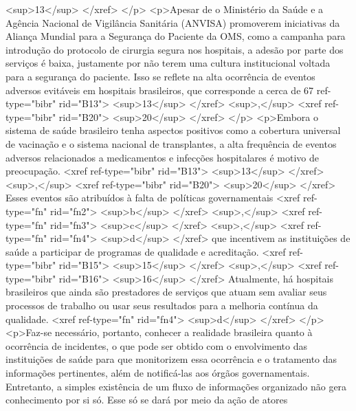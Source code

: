           <sup>13</sup>
        </xref>
      </p>
      <p>Apesar de o Ministério da Saúde e a Agência Nacional de Vigilância Sanitária (ANVISA)
        promoverem iniciativas da Aliança Mundial para a Segurança do Paciente da OMS, como a
        campanha para introdução do protocolo de cirurgia segura nos hospitais, a adesão por parte
        dos serviços é baixa, justamente por não terem uma cultura institucional voltada para a
        segurança do paciente. Isso se reflete na alta ocorrência de eventos adversos evitáveis em
        hospitais brasileiros, que corresponde a cerca de 67%
          ref-type="bibr" rid="B13">
          <sup>13</sup>
        </xref>
        <sup>,</sup>
        <xref ref-type="bibr" rid="B20">
          <sup>20</sup>
        </xref>
      </p>
      <p>Embora o sistema de saúde brasileiro tenha aspectos positivos como a cobertura universal de
        vacinação e o sistema nacional de transplantes, a alta frequência de eventos adversos
        relacionados a medicamentos e infecções hospitalares é motivo de preocupação. <xref
          ref-type="bibr" rid="B13">
          <sup>13</sup>
        </xref>
        <sup>,</sup>
        <xref ref-type="bibr" rid="B20">
          <sup>20</sup>
        </xref> Esses eventos são atribuídos à falta de políticas governamentais <xref ref-type="fn"
          rid="fn2">
          <sup>b</sup>
        </xref>
        <sup>,</sup>
        <xref ref-type="fn" rid="fn3">
          <sup>c</sup>
        </xref>
        <sup>,</sup>
        <xref ref-type="fn" rid="fn4">
          <sup>d</sup>
        </xref> que incentivem as instituições de saúde a participar de programas de qualidade e
        acreditação. <xref ref-type="bibr" rid="B15">
          <sup>15</sup>
        </xref>
        <sup>,</sup>
        <xref ref-type="bibr" rid="B16">
          <sup>16</sup>
        </xref> Atualmente, há hospitais brasileiros que ainda são prestadores de serviços que atuam
        sem avaliar seus processos de trabalho ou usar seus resultados para a melhoria contínua da
        qualidade. <xref ref-type="fn" rid="fn4">
          <sup>d</sup>
        </xref>
      </p>
      <p>Faz-se necessário, portanto, conhecer a realidade brasileira quanto à ocorrência de
        incidentes, o que pode ser obtido com o envolvimento das instituições de saúde para que
        monitorizem essa ocorrência e o tratamento das informações pertinentes, além de notificá-las
        aos órgãos governamentais. Entretanto, a simples existência de um fluxo de informações
        organizado não gera conhecimento por si só. Esse só se dará por meio da ação de atores
